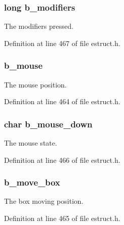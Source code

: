 \hypertarget{struct__ebox_ad230697acdd2d00abb2dc18dd38089d8}{
\subsubsection[{b\-\_\-modifiers}]{\setlength{\rightskip}{0pt plus 5cm}long b\-\_\-modifiers}}\label{struct__ebox_ad230697acdd2d00abb2dc18dd38089d8}
The modifiers pressed. 

Definition at line 467 of file estruct.\-h.

\hypertarget{struct__ebox_a8831d355ec1dbb2dca9a68268a977965}{
\subsubsection[{b\-\_\-mouse}]{ b\-\_\-mouse}}\label{struct__ebox_a8831d355ec1dbb2dca9a68268a977965}
The mouse position. 

Definition at line 464 of file estruct.\-h.

\hypertarget{struct__ebox_a1dc439a4d35e98f78370c81ceadc8ea0}{
\subsubsection[{b\-\_\-mouse\-\_\-down}]{\setlength{\rightskip}{0pt plus 5cm}char b\-\_\-mouse\-\_\-down}}\label{struct__ebox_a1dc439a4d35e98f78370c81ceadc8ea0}
The mouse state. 

Definition at line 466 of file estruct.\-h.

\hypertarget{struct__ebox_a2b028829ae54f8ccede6bb0d5903f7fd}{
\subsubsection[{b\-\_\-move\-\_\-box}]{ b\-\_\-move\-\_\-box}}\label{struct__ebox_a2b028829ae54f8ccede6bb0d5903f7fd}
The box moving position. 

Definition at line 465 of file estruct.\-h.


